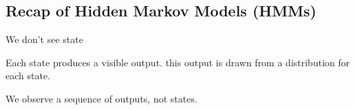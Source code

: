 
\subsection{Recap of Hidden Markov Models (HMMs)}

We don’t see state

Each state produces a visible output. this output is drawn from a distribution for each state.

We observe a sequence of outputs, not states.

